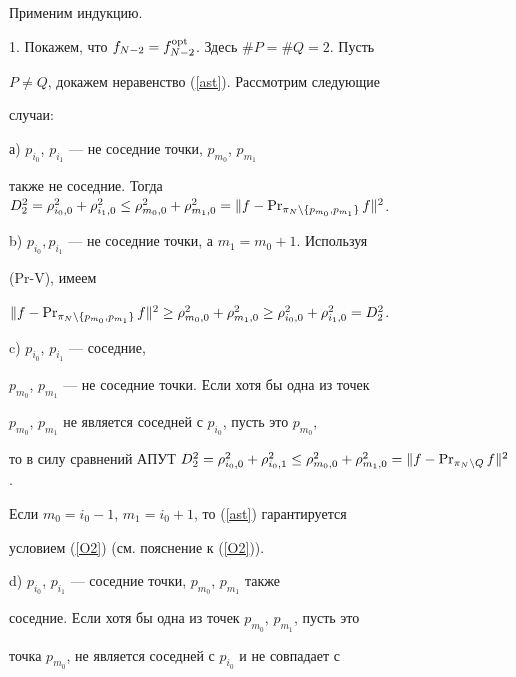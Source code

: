 \begin{pf}


Применим индукцию.





1. Покажем, что $f_{N-2}=f_{N-2}^{\operatorname{opt}}$. Здесь $\#P=\#Q=2$. Пусть


$P\neq Q$, докажем неравенство (\ref{ast}). Рассмотрим следующие


случаи:





а) $p_{i_0}$, $p_{i_1}$ --- не соседние точки, $p_{m_0}$, $p_{m_1}$


также не соседние. Тогда $D_2^2=\rho_{i_0,0}^2+


\rho_{i_1,0}^2\leq \rho_{m_0,0}^2+\rho_{m_1,0}^2


=\|f-\PR_{\pi_N\setminus\{p_{m_0},p_{m_1}\}}f\|^2$.





b) $p_{i_0},p_{i_1}$ --- не соседние точки, а $m_1=m_0+1$. Используя


(Pr-V), имеем


$\|f-\PR_{\pi_N\setminus\{p_{m_0},p_{m_1}\}}f\|^2\geq\rho_{m_0,0}^2+


\rho_{m_1,0}^2\geq \rho_{i_0,0}^2+ \rho_{i_1,0}^2=D_2^2$.





c) $p_{i_0}$, $p_{i_1}$ --- соседние,


$p_{m_0}$, $p_{m_1}$ --- не соседние точки. Если хотя бы одна из точек


$p_{m_0}$, $p_{m_1}$ не является соседней с $p_{i_0}$, пусть это $p_{m_0}$,


то в силу сравнений АПУТ $D_2^2=\rho_{i_0,0}^2+\rho_{i_0,1}^2\leq


\rho_{m_0,0}^2+\rho_{m_1,0}^2=\|f-\PR_{\pi_N\setminus Q}f\|^2$.


Если $m_0=i_0-1$, $m_1=i_0+1$, то (\ref{ast}) гарантируется


условием (\ref{O2}) (см. пояснение к (\ref{O2})).





d) $p_{i_0}$, $p_{i_1}$ --- соседние точки, $p_{m_0}$, $p_{m_1}$ также


соседние. Если хотя бы одна из точек $p_{m_0}$, $p_{m_1}$, пусть это


точка $p_{m_0}$, не является соседней с $p_{i_0}$ и не совпадает с



\end{pf}
